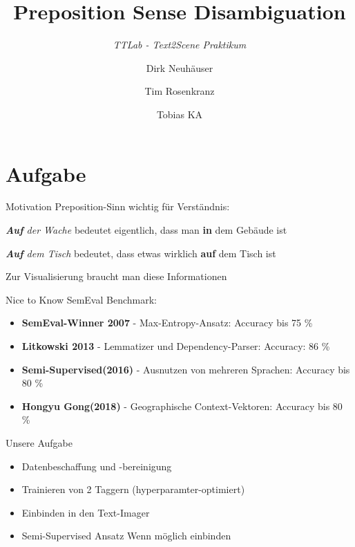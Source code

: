 \documentclass[xcolor=table]{beamer}
\title[Belief Propagation]{Preposition Sense Disambiguation}
\subtitle{\textit{TTLab - Text2Scene Praktikum}}
\author{Dirk Neuhäuser
\and 
Tim Rosenkranz
\and 
Tobias KA}
\institute[ode]{Prof. Dr. Alexander Mehler, Alexander Henlein}
\begin{document}
\begin{frame}
\titlepage
\end{frame}


\begin{frame}
\tableofcontents
\end{frame}


\section{Aufgabe}
\begin{frame}[t]{Motivation}\vspace{10pt}
Preposition-Sinn wichtig für Verständnis:
\begin{description}
\item \emph{\textbf{Auf} der Wache} bedeutet eigentlich, dass man \textbf{in} dem Gebäude ist
\item \emph{\textbf{Auf} dem Tisch} bedeutet, dass etwas wirklich \textbf{auf} dem Tisch ist
\end{description}
Zur Visualisierung braucht man diese Informationen
\end{frame}


\begin{frame}[t]{Nice to Know}\vspace{10pt}
	SemEval Benchmark:
	\begin{itemize}
		\item \textbf{SemEval-Winner 2007} - Max-Entropy-Ansatz: Accuracy bis 75 \%
		\item \textbf{Litkowski 2013} - Lemmatizer und Dependency-Parser: Accuracy: 86 \%
		\item \textbf{Semi-Supervised(2016)} - Ausnutzen von mehreren Sprachen: Accuracy bis 80 \%
		\item \textbf{Hongyu Gong(2018)} - Geographische Context-Vektoren: Accuracy bis 80 \%
	\end{itemize}
\end{frame}

\begin{frame}[t]{Unsere Aufgabe}\vspace{10pt}
	\begin{itemize}
		\item Datenbeschaffung und -bereinigung 
		\item Trainieren von 2 Taggern (hyperparamter-optimiert)
		\item Einbinden in den Text-Imager
		\item Semi-Supervised Ansatz Wenn möglich einbinden
	\end{itemize}
\end{frame}
\end{document}
